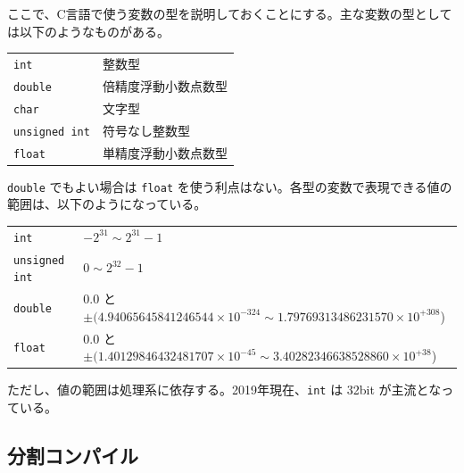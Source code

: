 ここで、C言語で使う変数の型を説明しておくことにする。主な変数の型としては以下のようなものがある。
\begin{table}[H]
\begin{center}
\begin{tabular}{ll}
  \verb+int+           &整数型 \\
  \verb+double+        &倍精度浮動小数点数型 \\
  \verb+char+          &文字型 \\
  \verb+unsigned int+  &符号なし整数型 \\
  \verb+float+         &単精度浮動小数点数型
\end{tabular}
\end{center}
\end{table} \noindent
\verb+double+ でもよい場合は \verb+float+ を使う利点はない。各型の変数で表現できる値の範囲は、以下のようになっている。
\begin{table}[H]
\begin{center}
\begin{tabular}{ll}
  \verb+int+          & $-2^{31}\sim 2^{31}-1$ \\
  \verb+unsigned int+ & $0\sim 2^{32}-1$ \\
  \verb+double+       & {\small 0.0 と $\pm(4.94065645841246544\times10^{-324}\sim 1.79769313486231570\times10^{+308}$)} \\
  \verb+float+        & {\small 0.0 と $\pm(1.40129846432481707\times10^{-45}\sim 3.40282346638528860\times10^{+38}$)}
\end{tabular}
\end{center}
\end{table} \noindent
ただし、値の範囲は処理系に依存する。2019年現在、\verb+int+ は 32bit が主流となっている。

\subsection {分割コンパイル}

